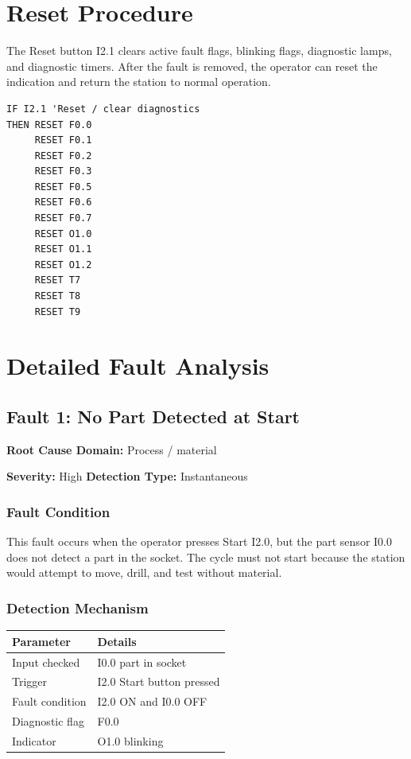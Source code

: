 \section{Reset Procedure}

The Reset button I2.1 clears active fault flags, blinking flags, diagnostic lamps, and diagnostic timers. After the fault is removed, the operator can reset the indication and return the station to normal operation.

\begin{verbatim}
IF I2.1 'Reset / clear diagnostics
THEN RESET F0.0
     RESET F0.1
     RESET F0.2
     RESET F0.3
     RESET F0.5
     RESET F0.6
     RESET F0.7
     RESET O1.0
     RESET O1.1
     RESET O1.2
     RESET T7
     RESET T8
     RESET T9
\end{verbatim}

\section{Detailed Fault Analysis}

\subsection{Fault 1: No Part Detected at Start}

\textbf{Root Cause Domain:} Process / material

\textbf{Severity:} High \quad \textbf{Detection Type:} Instantaneous

\subsubsection{Fault Condition}

This fault occurs when the operator presses Start I2.0, but the part sensor I0.0 does not detect a part in the socket. The cycle must not start because the station would attempt to move, drill, and test without material.

\subsubsection{Detection Mechanism}

\begin{longtable}{|p{3.6cm}|p{9.2cm}|}
\hline
Parameter & Details \\
\hline
Input checked & I0.0 part in socket \\
\hline
Trigger & I2.0 Start button pressed \\
\hline
Fault condition & I2.0 ON and I0.0 OFF \\
\hline
Diagnostic flag & F0.0 \\
\hline
Indicator & O1.0 blinking \\
\hline
\end{longtable}

